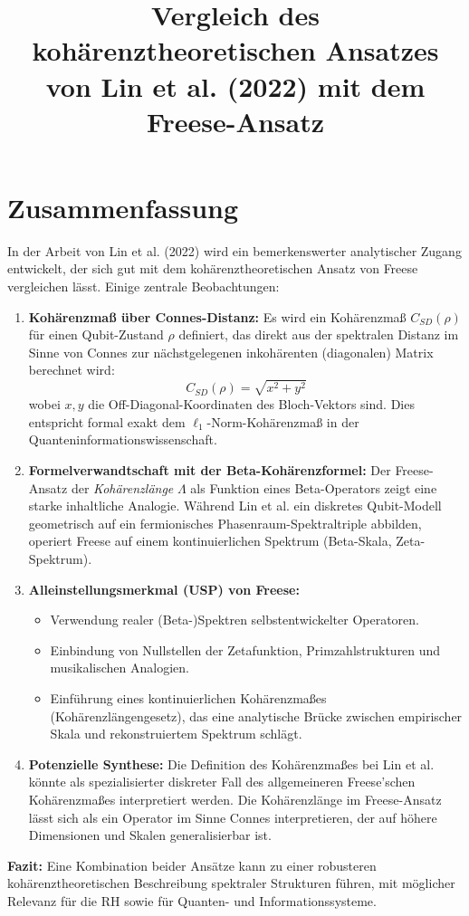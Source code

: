 \documentclass[12pt]{article}
\title{Vergleich des kohärenztheoretischen Ansatzes von Lin et al. (2022) mit dem Freese-Ansatz}
\author{}
\date{}
\begin{document}
\maketitle

\section*{Zusammenfassung}

In der Arbeit von Lin et al. (2022) wird ein bemerkenswerter analytischer Zugang entwickelt, der sich gut mit dem kohärenztheoretischen Ansatz von Freese vergleichen lässt. Einige zentrale Beobachtungen:

\begin{enumerate}
  \item \textbf{Kohärenzmaß über Connes-Distanz:} Es wird ein Kohärenzmaß $C_{SD}(\rho)$ für einen Qubit-Zustand $\rho$ definiert, das direkt aus der spektralen Distanz im Sinne von Connes zur nächstgelegenen inkohärenten (diagonalen) Matrix berechnet wird:
  \[
  C_{SD}(\rho) = \sqrt{x^2 + y^2}
  \]
  wobei $x, y$ die Off-Diagonal-Koordinaten des Bloch-Vektors sind. Dies entspricht formal exakt dem $\ell_1$-Norm-Kohärenzmaß in der Quanteninformationswissenschaft.

  \item \textbf{Formelverwandtschaft mit der Beta-Kohärenzformel:} Der Freese-Ansatz der \emph{Kohärenzlänge} $\Lambda$ als Funktion eines Beta-Operators zeigt eine starke inhaltliche Analogie. Während Lin et al. ein diskretes Qubit-Modell geometrisch auf ein fermionisches Phasenraum-Spektraltriple abbilden, operiert Freese auf einem kontinuierlichen Spektrum (Beta-Skala, Zeta-Spektrum).

  \item \textbf{Alleinstellungsmerkmal (USP) von Freese:}
  \begin{itemize}
    \item Verwendung realer (Beta-)Spektren selbstentwickelter Operatoren.
    \item Einbindung von Nullstellen der Zetafunktion, Primzahlstrukturen und musikalischen Analogien.
    \item Einführung eines kontinuierlichen Kohärenzmaßes (Kohärenzlängengesetz), das eine analytische Brücke zwischen empirischer Skala und rekonstruiertem Spektrum schlägt.
  \end{itemize}

  \item \textbf{Potenzielle Synthese:} Die Definition des Kohärenzmaßes bei Lin et al. könnte als spezialisierter diskreter Fall des allgemeineren Freese’schen Kohärenzmaßes interpretiert werden. Die Kohärenzlänge im Freese-Ansatz lässt sich als ein Operator im Sinne Connes interpretieren, der auf höhere Dimensionen und Skalen generalisierbar ist.
\end{enumerate}

\textbf{Fazit:} Eine Kombination beider Ansätze kann zu einer robusteren kohärenztheoretischen Beschreibung spektraler Strukturen führen, mit möglicher Relevanz für die RH sowie für Quanten- und Informationssysteme.
\end{document}
